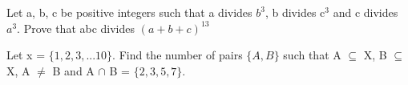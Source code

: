 \item Let a, b, c be positive integers such that a divides $b^3$, b divides c$^3$ and c divides $a^3$. Prove that abc divides $(a + b + c)^{13}$ 

\item Let x = $\{1, 2, 3,...10\}$. Find the number of pairs $\{A, B\}$ such that A $\subseteq$ X, B $\subseteq$ X, 
A $\neq$ B and A $\cap$ B = $\{2, 3, 5, 7\}$.
